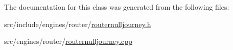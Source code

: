 The documentation for this class was generated from the following files\+:\begin{DoxyCompactItemize}
\item 
src/include/engines/router/\mbox{\hyperlink{routernulljourney_8h}{routernulljourney.\+h}}\item 
src/engines/router/\mbox{\hyperlink{routernulljourney_8cpp}{routernulljourney.\+cpp}}\end{DoxyCompactItemize}
